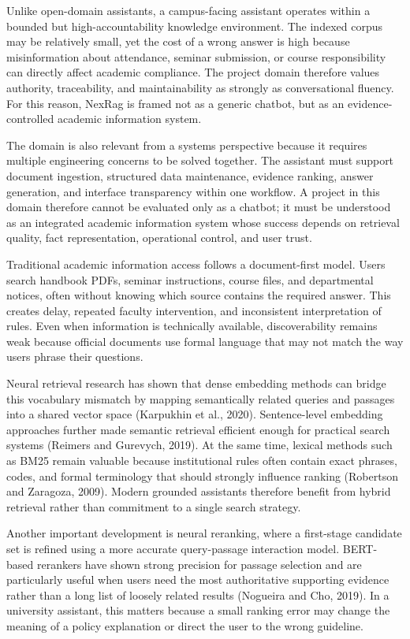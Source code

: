Unlike open-domain assistants, a campus-facing assistant operates within a bounded but high-accountability knowledge environment. The indexed corpus may be relatively small, yet the cost of a wrong answer is high because misinformation about attendance, seminar submission, or course responsibility can directly affect academic compliance. The project domain therefore values authority, traceability, and maintainability as strongly as conversational fluency. For this reason, NexRag is framed not as a generic chatbot, but as an evidence-controlled academic information system.

The domain is also relevant from a systems perspective because it requires multiple engineering concerns to be solved together. The assistant must support document ingestion, structured data maintenance, evidence ranking, answer generation, and interface transparency within one workflow. A project in this domain therefore cannot be evaluated only as a chatbot; it must be understood as an integrated academic information system whose success depends on retrieval quality, fact representation, operational control, and user trust.

\label{sec:introduction-background}

Traditional academic information access follows a document-first model. Users search handbook PDFs, seminar instructions, course files, and departmental notices, often without knowing which source contains the required answer. This creates delay, repeated faculty intervention, and inconsistent interpretation of rules. Even when information is technically available, discoverability remains weak because official documents use formal language that may not match the way users phrase their questions.

Neural retrieval research has shown that dense embedding methods can bridge this vocabulary mismatch by mapping semantically related queries and passages into a shared vector space (Karpukhin et al., 2020). Sentence-level embedding approaches further made semantic retrieval efficient enough for practical search systems (Reimers and Gurevych, 2019). At the same time, lexical methods such as BM25 remain valuable because institutional rules often contain exact phrases, codes, and formal terminology that should strongly influence ranking (Robertson and Zaragoza, 2009). Modern grounded assistants therefore benefit from hybrid retrieval rather than commitment to a single search strategy.

Another important development is neural reranking, where a first-stage candidate set is refined using a more accurate query-passage interaction model. BERT-based rerankers have shown strong precision for passage selection and are particularly useful when users need the most authoritative supporting evidence rather than a long list of loosely related results (Nogueira and Cho, 2019). In a university assistant, this matters because a small ranking error may change the meaning of a policy explanation or direct the user to the wrong guideline.


